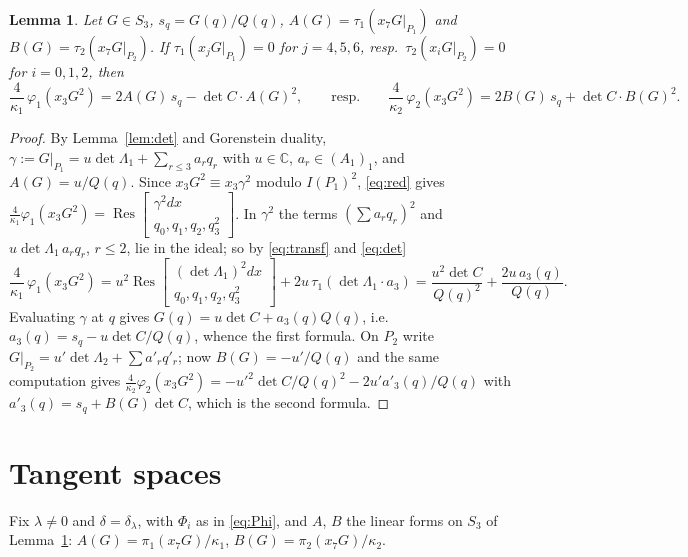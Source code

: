 \documentclass[10pt]{article}
\numberwithin{equation}{section}
\newtheorem{lemma}[theorem]{Lemma}
\theoremstyle{remark}
\newcommand{\CC}{\mathbb{C}}
\newcommand{\Res}{\operatorname{Res}}
\newcommand{\gres}[2]{\Res\!\begin{bmatrix} #1 \\ #2 \end{bmatrix}}
\begin{document}
\begin{lemma}\label{lem:phi}
Let $G\in S_3$, $s_q=G(q)/Q(q)$, $A(G)=\tau_1(x_7G|_{P_1})$ and $B(G)=\tau_2(x_7G|_{P_2})$. If
$\tau_1(x_jG|_{P_1})=0$ for $j=4,5,6$, resp.\ $\tau_2(x_iG|_{P_2})=0$ for $i=0,1,2$, then
\begin{equation}\label{eq:phi3}
\frac4{\kappa_1}\,\varphi_1(x_3G^2)=2A(G)\,s_q-\det C\cdot A(G)^2,\qquad\text{resp.}\qquad
\frac4{\kappa_2}\,\varphi_2(x_3G^2)=2B(G)\,s_q+\det C\cdot B(G)^2 .
\end{equation}
\end{lemma}
\begin{proof}
By Lemma~\ref{lem:det} and Gorenstein duality, $\gamma:=G|_{P_1}=u\det\Lambda_1+\sum_{r\le3}a_rq_r$ with
$u\in\CC$, $a_r\in(A_1)_1$, and $A(G)=u/Q(q)$. Since $x_3G^2\equiv x_3\gamma^2$ modulo $I(P_1)^2$,
\eqref{eq:red} gives $\frac4{\kappa_1}\varphi_1(x_3G^2)=\gres{\gamma^2dx}{q_0,q_1,q_2,q_3^2}$. In $\gamma^2$ the
terms $(\sum a_rq_r)^2$ and $u\det\Lambda_1\,a_rq_r$, $r\le2$, lie in the ideal; so by \eqref{eq:transf} and
\eqref{eq:det}
\[
\frac4{\kappa_1}\,\varphi_1(x_3G^2)=u^2\gres{(\det\Lambda_1)^2dx}{q_0,q_1,q_2,q_3^2}+2u\,\tau_1(\det\Lambda_1\cdot a_3)
=\frac{u^2\det C}{Q(q)^2}+\frac{2u\,a_3(q)}{Q(q)} .
\]
Evaluating $\gamma$ at $q$ gives $G(q)=u\det C+a_3(q)Q(q)$, i.e.\ $a_3(q)=s_q-u\det C/Q(q)$, whence the first
formula. On $P_2$ write $G|_{P_2}=u'\det\Lambda_2+\sum a'_rq'_r$; now $B(G)=-u'/Q(q)$ and the same computation
gives $\frac4{\kappa_2}\varphi_2(x_3G^2)=-u'^2\det C/Q(q)^2-2u'a'_3(q)/Q(q)$ with $a'_3(q)=s_q+B(G)\det C$,
which is the second formula.
\end{proof}

\section{Tangent spaces}\label{sec:tangent}
Fix $\lambda\neq0$ and $\delta=\delta_\lambda$, with $\Phi_i$ as in \eqref{eq:Phi}, and $A$, $B$ the linear forms
on $S_3$ of Lemma~\ref{lem:phi}: $A(G)=\pi_1(x_7G)/\kappa_1$, $B(G)=\pi_2(x_7G)/\kappa_2$.
\end{document}
